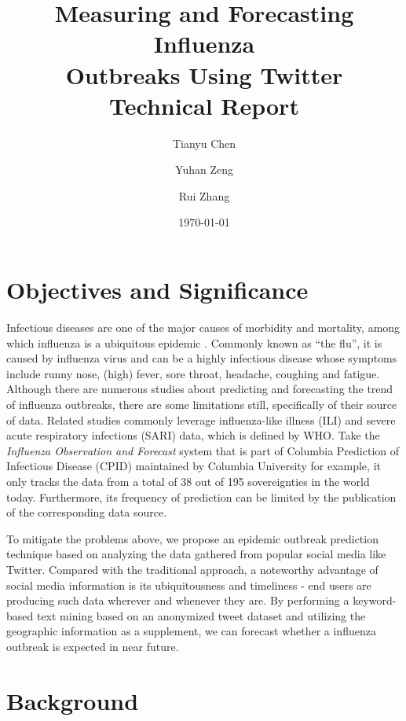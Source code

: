\documentclass[12pt, oneside]{article}
\title{Measuring and Forecasting Influenza \\
  Outbreaks Using Twitter \\
  \large Technical Report}
\author[1]{Tianyu Chen}
\author[2]{Yuhan Zeng}
\author[1]{Rui Zhang}
\affil[1]{Department of Computer Science, Indiana University}
\affil[2]{Department of Chemistry, Indiana University}
\affil[ ]{\textit{chen512@indiana.edu, \{rz20, yuhzeng\}@iu.edu}}
\date{\today}
\begin{document}
\maketitle




\section{Objectives and Significance}


Infectious diseases are one of the major causes of morbidity and mortality, among which influenza is a ubiquitous epidemic \cite{hickmann2015forecasting}.
Commonly known as ``the flu'', it is caused by influenza virus and can be a highly infectious disease whose symptoms include runny nose, (high) fever,
sore throat, headache, coughing and fatigue\cite{wiki:flu}. Although there are numerous studies about predicting and forecasting the trend of influenza outbreaks,
there are some limitations still, specifically of their source of data. Related studies commonly leverage influenza-like illness (ILI) and severe acute
respiratory infections (SARI) data, which is defined by WHO\cite{world2014global}. Take the \textit{Influenza Observation and Forecast} system that is part of
Columbia Prediction of Infectious Disease (CPID) maintained by Columbia University \cite{cpid} for example, it only tracks the data from a total of 38 out of
195 sovereignties in the world today. Furthermore, its frequency of prediction can be limited by the publication of the corresponding data source.

To mitigate the problems above, we propose an epidemic outbreak prediction technique based on analyzing the data gathered from popular social media
like Twitter. Compared with the traditional approach, a noteworthy advantage of social media information is its ubiquitousness and timeliness
- end users are producing such data wherever and whenever they are. By performing a keyword-based text mining based on an anonymized tweet dataset and utilizing
the geographic information as a supplement, we can forecast whether a influenza outbreak is expected in near future.




\section{Background}
\end{document}
